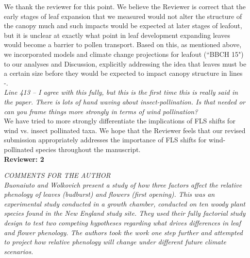 \documentclass[11pt]{article}
\begin{document}
\noindent We thank the reviewer for this point. We believe the Reviewer is correct that the early stages of leaf expansion that we measured would not alter the structure of the canopy much and such impacts would be expected at later stages of leafout, but it is unclear at exactly what point in leaf development expanding leaves would become a barrier to pollen transport.
Based on this, as mentioned above, we incorporated models and climate change projections for leafout (``BBCH 15") to our analyses and Discussion, explicitly addressing the idea that leaves must be a certain size before they would be expected to impact canopy structure in lines -.\\

\emph{Line 413 – I agree with this fully, but this is the first time this is really said in the paper. There is lots of hand waving about insect-pollination. Is that needed or can you frame things more strongly in terms of wind pollination?}\\

\noindent We have tried to more strongly differentiate the implications of FLS shifts for wind vs. insect pollinated taxa. We hope that the Reviewer feels that our revised submission appropriately addresses the importance of FLS shifts for wind-pollinated species throughout the manuscript.\\

\textbf{Reviewer: 2}

\emph{COMMENTS FOR THE AUTHOR}\\
\emph{Buonaiuto and Wolkovich present a study of how three factors affect the relative phenology of leaves (budburst) and flowers (first opening).  This was an experimental study conducted in a growth chamber, conducted on ten woody plant species found in the New England study site. They used their fully factorial study design to test two competing hypotheses regarding what drives differences in leaf and flower phenology. The authors took the work one step further and attempted to project how relative phenology will change under different future climate scenarios.}\\
\end{document}
